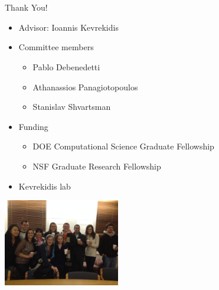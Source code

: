 \documentclass[12pt]{beamer}
\begin{document}
\section{}

\begin{frame}{Thank You!}

\begin{minipage}{0.45\textwidth}

\begin{itemize}
\item Advisor: Ioannis Kevrekidis
\item Committee members
\begin{itemize}
	\item Pablo Debenedetti
	\item Athanassios Panagiotopoulos
	\item Stanislav Shvartsman
\end{itemize}
\item Funding
\begin{itemize}
	\item DOE Computational Science Graduate Fellowship
	\item NSF Graduate Research Fellowship
\end{itemize}
\item Kevrekidis lab
\end{itemize} 
\end{minipage}
%
\begin{minipage}{2in}

\centering

\includegraphics[width=2in]{classmates}


\end{minipage}
\end{frame}
\end{document}
